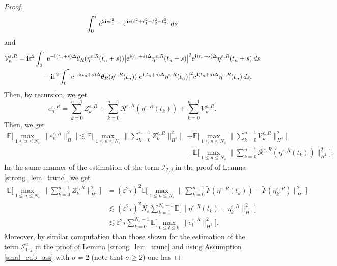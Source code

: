 \documentclass[a4paper]{amsart}
\begin{document}
\begin{proof}
\begin{align*}
         \int_0^\tau  {\rm e}^{2{\bf i}s \ell_1^2}-{\rm e}^{{\bf i}s (\ell^2+\ell_1^2-\ell_2^2-\ell_3^2)}\,ds
    \end{align*}
and
\begin{align*}
   & \mathcal{V}^{\varepsilon,R}_n = {\bf i}\varepsilon^2 \int_0^\tau {\rm e}^{-{\bf i}(t_n+s)\Delta}\theta_R(\eta^{\varepsilon,R}(t_n+s))\big|{\rm e}^{{\bf i}(t_n+s)\Delta}\eta^{\varepsilon,R}(t_n+s)\big|^2 {\rm e}^{{\bf i}(t_n+s)\Delta}\eta^{\varepsilon,R}(t_n+s)\,ds\\
    &\hspace{2cm}-{\bf i}\varepsilon^2 \int_0^\tau {\rm e}^{-{\bf i}(t_n+s)\Delta}\theta_R(\eta^{\varepsilon,R}(t_n))\big|{\rm e}^{{\bf i}(t_n+s)\Delta}\eta^{\varepsilon,R}(t_n)\big|^2 {\rm e}^{{\bf i}(t_n+s)\Delta}\eta^{\varepsilon,R}(t_n)\,ds.
\end{align*}
Then, by recursion, we get
$$
e^{\varepsilon,R}_{n}=\sum_{k=0}^{n-1}Z^{\varepsilon,R}_k+\sum_{k=0}^{n-1}\mathcal{R}^{\varepsilon,R}(\eta^{\varepsilon,R}(t_k))+\sum_{k=0}^{n-1}\mathcal{V}^{\varepsilon,R}_k.
$$
Then, we get
\begin{align*}
\mathbb{E}\big[\max_{1\le n\le N_\varepsilon}\|e^{\varepsilon,R}_{n}\|^{2}_{H^1}\big] \lesssim \mathbb{E}\big[\max_{1\le n\le N_\varepsilon}\|\sum_{k=0}^{n-1}Z^{\varepsilon,R}_{k}\|^{2}_{H^1}\big]&+\mathbb{E}\big[\max_{1\le n\le N_\varepsilon}\|\sum_{k=0}^{n-1}\mathcal{V}^{\varepsilon,R}_k\|^{2}_{H^1}\big]\\
&+\mathbb{E}\big[\max_{1\le n \le N_\varepsilon}\|\sum_{k=0}^{n-1}\mathcal{R}^{\varepsilon,R}(\eta^{\varepsilon,R}(t_k))\|^{2}_{H^1}\big].
\end{align*}
In the same manner of the estimation of the term $\mathcal{I}_{2,j}$ in the proof of Lemma \ref{strong_lem_trunc}, we get
\begin{align*}
\mathbb{E}\big[\max_{1\le n\le N_\varepsilon}\|\sum_{k=0}^{n-1}Z^{\varepsilon,R}_{k}\|^{2}_{H^1}\big]& = (\varepsilon^2\tau)^{2} \mathbb{E}\big[\max_{1\le n\le N_\varepsilon}\|\sum_{k=0}^{n-1}\tilde{F}(\eta^{\varepsilon,R}(t_k))-\tilde{F}(\eta^{\varepsilon,R}_k)\|^{2}_{H^1}\big]\\
&\lesssim (\varepsilon^2\tau)^{2}N_\varepsilon\sum_{k=0}^{N_\varepsilon-1}\mathbb{E}\big[\|\eta^{\varepsilon,R}(t_k)-\eta^{\varepsilon,R}_k\|^{2}_{H^1}\big]\\
&\lesssim \varepsilon^2 \tau \sum_{k=0}^{N_\varepsilon-1}\mathbb{E}\big[\max_{0\le l\le k}\|e^{\varepsilon,R}_l\|^{2}_{H^1}\big].
\end{align*}
Moreover, by similar computation than those shown for the estimation of the term $\mathcal{I}_{1,j}^{a}$ in the proof of Lemma \ref{strong_lem_trunc} and using Assumption \ref{smal_cub_ass} with $\sigma=2$ (note that $\sigma \ge 2$) one has

\end{proof}
\end{document}

